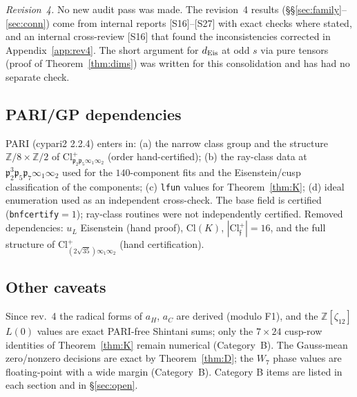 \documentclass[11pt]{article}
\theoremstyle{definition}
\theoremstyle{plain}
\newcommand{\Z}{\mathbb{Z}}
\newcommand{\fp}{\mathfrak{p}}
\newcommand{\ff}{\mathfrak{f}}
\newcommand{\src}[1]{\textup{[S#1]}}
\begin{document}
\emph{Revision~4.} No new audit pass was made. The revision~4 results (\S\S\ref{sec:family}--\ref{sec:conn}) come from internal reports \src{16}--\src{27} with exact
checks where stated, and an internal cross-review \src{16} that found the inconsistencies corrected in Appendix~\ref{app:rev4}. The short argument for
$d_{\rm Eis}$ at odd $s$ via pure tensors (proof of Theorem~\ref{thm:dims}) was written for this consolidation and has had no separate check.

\subsection{PARI/GP dependencies}
PARI (cypari2 2.2.4) enters in: (a) the narrow class group and the structure $\Z/8\times\Z/2$ of $\mathrm{Cl}^+_{\fp_2\fp_5\infty_1\infty_2}$ (order hand-certified);
(b) the ray-class data at $\fp_2^3\fp_5\fp_7\infty_1\infty_2$ used for the $140$-component fits and the Eisenstein/cusp classification of the components; (c) \texttt{lfun} values for
Theorem~\ref{thm:K}; (d) ideal enumeration used as an independent cross-check. The base field is certified (\texttt{bnfcertify}$=1$); ray-class routines
were not independently certified. Removed dependencies: $u_L$ Eisenstein (hand proof), $\mathrm{Cl}(K)$, $|\mathrm{Cl}^+_\ff|=16$, and the full structure of
$\mathrm{Cl}^+_{(2\sqrt{35})\infty_1\infty_2}$ (hand certification).

\subsection{Other caveats}
Since rev.~4 the radical forms of $a_H$, $a_C$ are derived (modulo F1), and the $\Z[\zeta_{12}]$ $L(0)$ values are exact PARI-free Shintani sums; only the
$7\times24$ cusp-row identities of Theorem~\ref{thm:K} remain numerical (Category~B). The Gauss-mean zero/nonzero decisions are exact by Theorem~\ref{thm:D}; the
$W_7$ phase values are floating-point with a wide margin (Category~B). Category B items are listed in each section and in
\S\ref{sec:open}.
\end{document}
